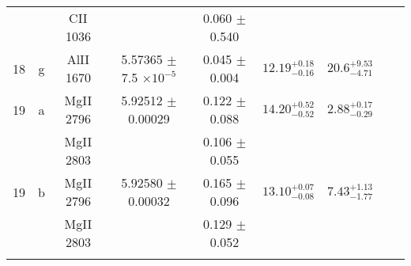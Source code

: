 \documentclass[12pt]{article}
\begin{document}
\begin{footnotesize}
\begin{longtable}{ c c c c c c c c c}
  &   & CII     1036  &  &  0.060 $\pm$ 0.540   &   &     & 	 & \\ 
      18  & g  & AlII     1670  &  5.57365 $\pm$ 7.5 $\times 10^{-5}$   &  0.045 $\pm$ 0.004   & $12.19_{ - 0.16}^{ + 0.18}$  & $20.6_{ - 4.71}^{ + 9.53}$    & 	 & \\ 
      19  & a  & MgII     2796  &  5.92512 $\pm$ 0.00029  &  0.122 $\pm$ 0.088   & $14.20_{ - 0.52}^{ + 0.52}$  & $2.88_{ - 0.29}^{ + 0.17}$    & 	 & \\ 
  &   & MgII     2803  &  &  0.106 $\pm$ 0.055   &   &     & 	 & \\ 
      19  & b  & MgII     2796  &  5.92580 $\pm$ 0.00032  &  0.165 $\pm$ 0.096   & $13.10_{ - 0.08}^{ + 0.07}$  & $7.43_{ - 1.77}^{ + 1.13}$    & 	 & \\ 
  &   & MgII     2803  &  &  0.129 $\pm$ 0.052   &   &     & 	 & \\ 
 &        &                   &                &   & 					&							&   	 	& \\  
\hline                                                                                                           
\hline                                                                                                           
\end{longtable}                                                                                                  
\end{footnotesize}                                                                                                  
\end{document}
